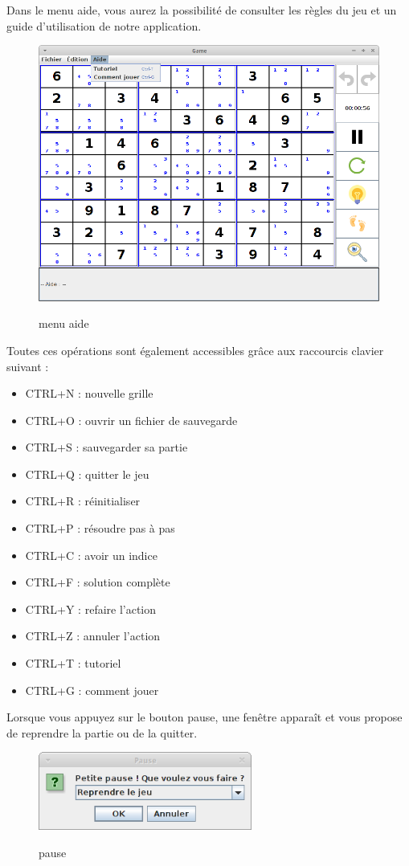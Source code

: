 \newpage
Dans le menu aide, vous aurez la possibilité de consulter 
les règles du jeu et un guide d'utilisation de notre application.

\begin{figure}[ht]
  \caption{\label{annexe9} menu aide}
  \includegraphics [width=130mm]{images/aide.png} \\[0.5cm]
\end{figure}

\newpage
Toutes ces opérations sont également accessibles grâce aux raccourcis clavier suivant :
\begin{itemize}
 \item CTRL+N : nouvelle grille
 \item CTRL+O : ouvrir un fichier de sauvegarde
 \item CTRL+S : sauvegarder sa partie
 \item CTRL+Q : quitter le jeu
 \item CTRL+R : réinitialiser
 \item CTRL+P : résoudre pas à pas
 \item CTRL+C : avoir un indice
 \item CTRL+F : solution complète
 \item CTRL+Y : refaire l'action
 \item CTRL+Z : annuler l'action
 \item CTRL+T : tutoriel
 \item CTRL+G : comment jouer
\end{itemize}

\newpage
Lorsque vous appuyez sur le bouton pause, une fenêtre apparaît 
et vous propose de reprendre la partie ou de la quitter.
\begin{figure}[ht]
  \caption{\label{annexe10} pause}
  \includegraphics [width=70mm]{images/pause.png} \\[0.5cm]
\end{figure}

